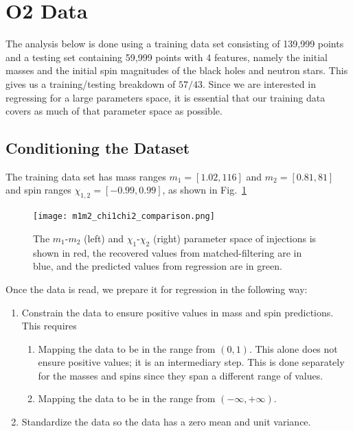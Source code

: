 \documentclass[aps,prd,twocolumn,superscriptaddress,preprintnumbers,floatfix,nofootinbib]{revtex4-2}
\begin{document}
\section{O2 Data}
The analysis below is done using a training data set consisting of 139,999
points and a testing set containing 59,999 points with 4 features, namely the
initial masses and the initial spin magnitudes of the black holes and neutron
stars. This gives us a training/testing breakdown of $57/43$. Since we are 
interested in regressing for a large parameters space, it is essential that 
our training data covers as much of that parameter space as possible.

\subsection{Conditioning the Dataset}
The training data set has mass ranges $m_1 =  [1.02, 116]$ and 
$m_2 =  [0.81, 81]$ and spin ranges $\chi_{1,2} =  [-0.99, 0.99]$, as shown in 
Fig.~\ref{m1m2_chi1chi2_comparison}

\begin{figure}[h]
	\centering
	\texttt{[image: m1m2\_chi1chi2\_comparison.png]}
	\caption{The $m_1$-$m_2$ (left) and $\chi_1$-$\chi_2$ (right) parameter space 
		of injections is shown in red, the recovered
  		values from matched-filtering are in blue, and the predicted values from 
		regression are in green.}
	\label{m1m2_chi1chi2_comparison}
\end{figure}

Once the data is read, we prepare it for regression in the following way:
\begin{enumerate}[label=(\roman*)]
	\item Constrain the data to ensure positive values in mass and spin predictions. This requires
	\begin{enumerate}
		\item Mapping the data to be in the range from $(0,1)$. This alone does not
			ensure positive values; it is an intermediary step. This is done separately for the
			masses and spins since they span a different range of values.
		\item Mapping the data to be in the range from $(-\infty,+\infty)$.
	 \end{enumerate}
	\item Standardize the data so the data has a zero mean and unit variance.
\end{enumerate}
\end{document}
